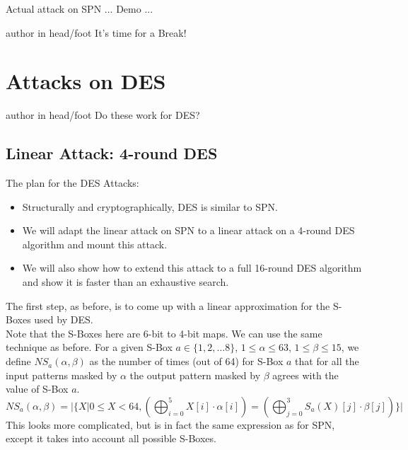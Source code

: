 \documentclass[9pt]{beamer}
\begin{document}
\begin{frame}
Actual attack on SPN ... Demo ...
\end{frame}

\begin{frame}
\begin{beamercolorbox}[ht=2.5ex,dp=1.125ex,center,rounded=true,shadow=true]{author in head/foot}
It's time for a Break!
\end{beamercolorbox}
\end{frame}


\section{Attacks on DES}
\begin{frame}
\begin{beamercolorbox}[ht=2.5ex,dp=1.125ex,center,rounded=true,shadow=true]{author in head/foot}
Do these work for DES?
\end{beamercolorbox}
\end{frame}

\subsection{Linear Attack: 4-round DES}
\begin{frame}
The plan for the DES Attacks:
\begin{itemize}
\item{Structurally and cryptographically, DES is similar to SPN.}
\item{We will adapt the linear attack on SPN to a linear attack on a 4-round DES algorithm and mount this attack.}
\item{We will also show how to extend this attack to a full 16-round DES algorithm and show it is faster than an exhaustive search.}
\end{itemize}
\end{frame}

\begin{frame}
The first step, as before, is to come up with a linear approximation for the S-Boxes used by DES.\\
\vspace{5mm}
Note that the S-Boxes here are 6-bit to 4-bit maps. We can use the same technique as before. For a given S-Box $a \in \{1, 2, \dots 8\}$, $1 \leq \alpha \leq 63$, $1 \leq \beta \leq 15$, we define $NS_{a}(\alpha, \beta)$ as the number of times (out of 64) for S-Box $a$ that for all the input patterns masked by $\alpha$ the output pattern masked by $\beta$ agrees with the value of S-Box $a$.
\[ NS_{a}(\alpha, \beta) = | \{ X | 0 \leq X < 64, ( \bigoplus_{i=0}^5 X[i]\cdot\alpha[i]) = (\bigoplus_{j=0}^3 S_a(X)[j] \cdot \beta[j])\} | \]
This looks more complicated, but is in fact the same expression as for SPN, except it takes into account all possible S-Boxes.
\end{frame}
\end{document}
